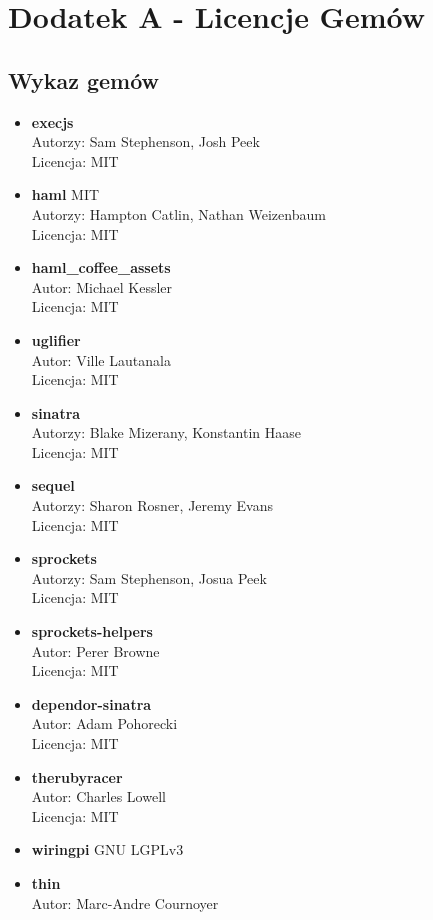 \documentclass[11pt,a4paper, twoside]{article}
\begin{document}
\section{Dodatek A - Licencje Gemów}
\subsection{Wykaz gemów}
\begin{itemize}
\item \textbf{execjs}  \\
Autorzy: Sam Stephenson, Josh Peek \\
Licencja: MIT
\item \textbf{haml} MIT \\
Autorzy: Hampton Catlin, Nathan Weizenbaum \\
Licencja: MIT
\item \textbf{haml\_coffee\_assets} \\
Autor: Michael Kessler \\
Licencja: MIT
\item \textbf{uglifier} \\
Autor: Ville Lautanala \\
Licencja: MIT
\item \textbf{sinatra} \\
Autorzy: Blake Mizerany, Konstantin Haase \\
Licencja: MIT 
\item \textbf{sequel} \\
Autorzy: Sharon Rosner, Jeremy Evans \\
Licencja: MIT
\item \textbf{sprockets} \\
Autorzy: Sam Stephenson, Josua Peek \\
Licencja: MIT
\item \textbf{sprockets-helpers} \\ 
Autor: Perer Browne \\
Licencja: MIT
\item \textbf{dependor-sinatra} \\ 
Autor: Adam Pohorecki \\
Licencja: MIT
\item \textbf{therubyracer} \\ 
Autor: Charles Lowell \\
Licencja: MIT
\item \textbf{wiringpi} GNU LGPLv3
\item \textbf{thin} \\ 
Autor: Marc-Andre Cournoyer \\

\end{itemize}
\end{document}
